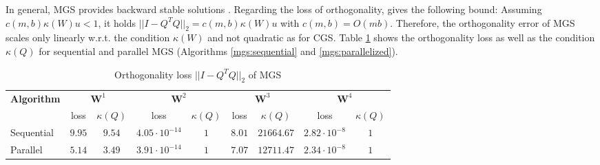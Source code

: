 \documentclass{article}
\begin{document}
In general, MGS provides backward stable solutions \cite{Bornemann:2018}.
Regarding the loss of orthogonality, \citeauthor{Grigori:2023}
\cite{Grigori:2023} gives the following bound: Assuming $c(m,b) \kappa(W) u <
1$, it holds $||I - Q^T Q||_2 = c(m,b) \kappa(W) u$ with $c(m,b) = O(mb)$.
Therefore, the orthogonality error of MGS scales only linearly w.r.t. the
condition $\kappa(W)$ and not quadratic as for CGS. Table
\ref{tab:errorOrthoMGS} shows the orthogonality loss as well as the condition
$\kappa(Q)$ for sequential and parallel MGS (Algorithms \ref{mgs:sequential} and
\ref{mgs:parallelized}).
\begin{table}[t]
    \centering
    \caption{Orthogonality loss $||I - Q^T Q||_2$ of MGS} \label{tab:errorOrthoMGS}
    \renewcommand{\arraystretch}{1.2}
    \begin{tabular}{|p{1.5cm}|c|c|c|c|c|c|c|c|}
      \hline
      \multirow{2}{1cm}{\textbf{Algorithm}} & \multicolumn{2}{c|}{$\textbf{W}^1$} &
      \multicolumn{2}{c|}{$\textbf{W}^2$} & \multicolumn{2}{c|}{$\textbf{W}^3$} &
      \multicolumn{2}{c|}{$\textbf{W}^4$}\\
      \cline{2-9}
      & loss & $\kappa(Q)$ & loss & $\kappa(Q)$
      & loss & $\kappa(Q)$ & loss & $\kappa(Q)$\\
      \hline
      Sequential    & $9.95$ & $9.54$ & $4.05 \cdot 10^{-14}$ & $1$
                        & $8.01$ & $21664.67$ & $2.82 \cdot 10^{-8}$ & $1$ \\ \hline
      Parallel      & $5.14$ & $3.49$ & $3.91 \cdot 10^{-14}$ & $1$
                        & $7.07$ & $12711.47$ & $2.34 \cdot 10^{-8}$ & $1$ \\ \hline
    \end{tabular}
  \end{table}
\end{document}
